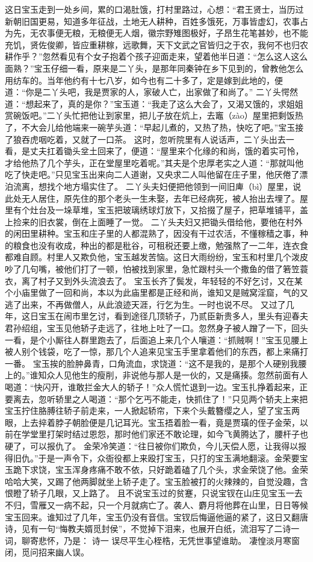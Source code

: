 \documentclass[12pt,oneside]{book}
\begin{document}
这日宝玉走到一处乡间，累的口渴肚饿，打村里路过，心想：“君王贤士，当历过新朝旧国更易，知道多年征战，土地无人耕种，百姓多饿死，万事皆虚幻，农事占为先，无农事便无粮，无粮便无人烟，徽宗野雉图极好，子昂生花笔甚妙，也不能充饥，贤佐俊卿，皆应重耕稼，远歌舞，天下文武之官皆归之于农，我何不也归农耕作乎？”忽然看见有个女子抱着个孩子迎面走来，望着他半日道：“怎么这人这么面熟？”宝玉仔细一看，原来是二丫头，是那年同秦钟在乡下见到的，曾教他怎么用纺车的。当年他约有十七八岁，如今也有二十多了，定是嫁到此地的，便道：“你是二丫头吧，我是贾家的人，家破人亡，出家做了和尚了。”
二丫头愕然道：“想起来了，真的是你？”宝玉道：“我走了这么大会了，又渴又饿的，求姐姐赏碗饭吧。”二丫头忙把他让到家里，把儿子放在炕上，去竈（zào）屋里把剩饭热了，不大会儿给他端来一碗芋头道：“早起儿煮的，又热了热，快吃了吧。”宝玉接了狼吞虎咽吃着，又就了一口茶。
这时，忽听院里有人说话声，二丫头出去一看，是丈夫扛着锄头坌土回来了，便道：“屋里来个化缘的和尚，饿的着实可怜，才给他热了几个芋头，正在堂屋里吃着呢。”其夫是个忠厚老实之人道：“那就叫他吃了快走吧。”只见宝玉出来向二人道谢，又央求二人叫他留在庄子里，他厌倦了漂泊流离，想找个地方塌实住了。
二丫头夫妇便把他领到一间旧庳（bì）屋里，说此处无人居住，原先住的那个老头一生未娶，去年已经病死，被人抬出去埋了。屋里有个灶台及一垛草堆，宝玉把玻璃绣球灯放下，又拾掇了屋子，把草堆铺平，盖上捡来的旧衣裳，倒在上面睡了一觉。
二丫头夫妇又把锄头借给他，要他在村外的闲田里耕种。宝玉和庄子里的人都混熟了，因没有干过农活，不懂稼穑之事，种的粮食也没有收成，种出的都是秕谷，可租税还要上缴，勉强熬了一二年，连衣食都难自顾。村里人又欺负他，宝玉越发苦恼。这日大雨纷纷，宝玉和村里几个泼皮吵了几句嘴，被他们打了一顿，怕被找到家里，急忙跟村头一个撒鱼的借了箬笠蓑衣，离了村子又到外头流浪去了。
宝玉长齐了鬓发，年轻轻的不好乞讨，又在某个小庙里做了一回和尚，本以为此庙里都是正经和尚，谁知又是贼窝淫窟，气的又逃了出来，不再做僧人，从此浪迹天涯，行乞为生。一时也说不尽。
又过了几年，这日宝玉在闹市里乞讨，看到途径几顶轿子，乃贰臣新贵多人，里头有迎春夫君孙绍组，宝玉见他轿子走远了，往地上吐了一口。忽然身子被人蹭了一下，回头一看，是个小厮往人群里跑去了，后面追上来几个人嚷道：“抓贼啊！”宝玉见腰上被人别个钱袋，吃了一惊，那几个人追来见宝玉手里拿着他们的东西，都上来痛打一番。
宝玉挨的脸肿鼻青，口角流血，求饶道：“这不是我的，是那个人硬别我腰上的。”谁知众人见他生的瘦削，非说他与那人是一伙的，又是痛揍。忽然前面有人喝道：“快闪开，谁敢拦金大人的轿子！”众人慌忙退到一边。宝玉扎挣着起来，正要离去，忽听轿里之人喝道：“那个乞丐不能走，快抓住了！”只见两个轿夫上来把宝玉拧住胳膊往轿子前走来，一人掀起轿帘，下来个头戴簪缨之人，望了宝玉两眼，上去捽着脖子朝脸便是几记耳光。宝玉捂着脸一看，竟是贾璜的侄子金荣，以前在学堂里打架时结过恩怨，那时他们家还不敢论理，如今飞黄腾达了，腰杆子也硬了，可以报仇了。
金荣冷笑道：“往日被你们欺负，今儿天偿人愿，让我得以报得旧仇。”于是一声令下，众衙役都上来殴打宝玉，只打的宝玉满地翻滚。金荣要宝玉跪下求饶，宝玉浑身疼痛不敢不依，只好跪着磕了几个头，求金荣饶了他。金荣哈哈大笑，又踢了他两脚就坐上轿子走了。宝玉脸被打的火辣辣的，自觉没趣，含恨瞪了轿子几眼，又上路了。
且不说宝玉过的贫蹇，只说宝钗在山庄见宝玉一去不归，雪雁又一病不起，只一个月就病亡了。袭人、麝月将他葬在山里，日日等候宝玉回来。谁知过了几年，宝玉仍没有音信。宝钗后悔逼他逼的紧了，这日又翻唐诗，见有一句“悔教夫婿觅封侯”，不觉掉下泪来，也展开白纸，流泪写了二诗一词，聊寄悲怀，乃是：
诗一 
误尽平生心桎梏，无凭世事望谁助。
凄惶淡月寒窗闭，觅问招来幽人误。 
\end{document}
